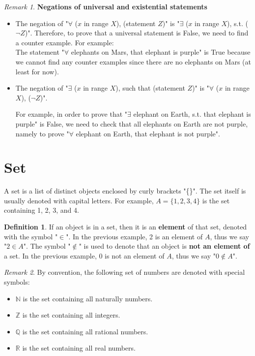 \documentclass{book}
\theoremstyle{remark}
\newtheorem{remark}{Remark}[section]
\theoremstyle{definition}
\newtheorem{definition}{Definition}[section]
\begin{document}
\begin{remark} \textbf{Negations of universal and existential statements}\\
    \begin{itemize}
        \item The negation of "$\forall$ ($x$ in range $X$), (statement $Z$)" is "$\exists$ ($x$ in range $X$), s.t. ($\neg Z$)". Therefore, to prove that a universal statement is False, we need to find a counter example. For example:\\
        
        The statement "$\forall$ elephants on Mars, that elephant is purple" is True because we cannot find any counter examples since there are no elephants on Mars (at least for now).
        
        \item The negation of "$\exists$ ($x$ in range $X$), such that (statement $Z$)" is "$\forall$ ($x$ in range $X$), ($\neg Z$)".

        For example, in order to prove that "$\exists$ elephant on Earth, s.t. that elephant is purple" is False, we need to check that all elephants on Earth are not purple, namely to prove "$\forall$ elephant on Earth, that elephant is not purple".
    \end{itemize}
    
\end{remark}



\section{Set}
A set is a list of distinct objects enclosed by curly brackets "\{\}". The set itself is usually denoted with capital letters. For example, $A=\{1, 2, 3, 4\}$ is the set containing 1, 2, 3, and 4. 

\begin{definition}
    If an object is in a set, then it is an \textbf{element} of that set, denoted with the symbol "$\in$". In the previous example, 2 is an element of $A$, thus we say "$2\in A$". The symbol "$\notin$" is used to denote that an object is \textbf{not an element of} a set. In the previous example, 0 is not an element of $A$, thus we say "$0\notin A$".
\end{definition}

\begin{remark}
    By convention, the following set of numbers are denoted with special symbols:
    \begin{itemize}
        \item $\mathbb{N}$ is the set containing all naturally numbers.
        \item $\mathbb{Z}$ is the set containing all integers.
        \item $\mathbb{Q}$ is the set containing all rational numbers.
        \item $\mathbb{R}$ is the set containing all real numbers.
    \end{itemize}
\end{remark}
\end{document}
